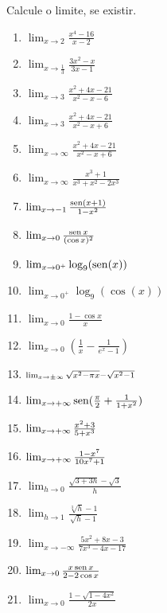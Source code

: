 \begin{exo}
Calcule o limite, se existir.
\begin{multicols}{3}
\begin{enumerate}
\item\label{itrevisaolimites1} $\lim_{x\to 2}\frac{x^4-16}{x-2}$
\item\label{itrevisaolimites11} $\lim_{x\to \frac13}\frac{3x^2-x}{3x-1}$
\item\label{itrevisaolimites2} $\lim_{x\to 3}\frac{x^2+4x-21}{x^2-x-6}$
\item\label{itrevisaolimites3} $\lim_{x\to 3}\frac{x^2+4x-21}{x^2-x+6}$
\item\label{itrevisaolimites31} $\lim_{x\to \infty}\frac{x^2+4x-21}{x^2-x+6}$
\item\label{itrevisaolimites4} $\lim_{x\to\infty}\frac{x^3+1}{x^3+x^2-2x^3}$
\item\label{itrevisaolimites5} $\lim_{x\to -1}\frac{\operatorname{sen}(x+1)}{1-x^2}$
\item\label{itrevisaolimites6} $\lim_{x\to 0}\frac{\operatorname{sen} x}{(\cos x)^2}$
\item\label{itrevisaolimites7} $\lim_{x\to 0^+}\log_9(\operatorname{sen}(x))$
\item\label{itrevisaolimites8} $\lim_{x\to 0^+}\log_9(\cos(x))$
\item\label{itrevisaolimites9} $\lim_{x\to 0}\frac{1-\cos x}{x}$
\item\label{itrevisaolimites10} $\lim_{x\to 0}(\frac1x-\frac{1}{e^x-1})$ 
\item\label{itrevisaolimites12} $\scriptstyle{
\lim_{{x}\to {\pm \infty}}\sqrt{x^2-\pi
x}-\sqrt{x^2-1}}$
\item\label{itrevisaolimites13}
$\lim_{{x}\to {+\infty}}\operatorname{sen}(\frac{\pi}{2}+\frac{1}{1+x^2})$
\item\label{itrevisaolimites14} $\lim_{{x}\to {+\infty}}\frac{x^2+3}{5+x^3}$
\item\label{itrevisaolimites15} $\lim_{{x}\to {+\infty}}\frac{1-x^7}{10x^7+1}$
\item\label{itrevisaolimites16} $\lim_{h\to 0}\frac{\sqrt{3+3h}-\sqrt{3}}{h}$
\item\label{itrevisaolimites161} $\lim_{h\to 1}\frac{\sqrt[3]{h}-1}{\sqrt{h}-1}$
\item\label{itrevisaolimites17} $\lim_{x\to
-\infty}\frac{5x^2+8x-3}{7x^3-4x-17}$
\item\label{itrevisaolimites20} $\lim_{x\to 0}\frac{x\operatorname{sen} x}{2-2\cos x}$
\item\label{itrevisaolimites21} $\lim_{x\to
0}\frac{1-\sqrt{1-4x^2}}{2 x}$
\end{enumerate}

\end{multicols}
\end{exo}
